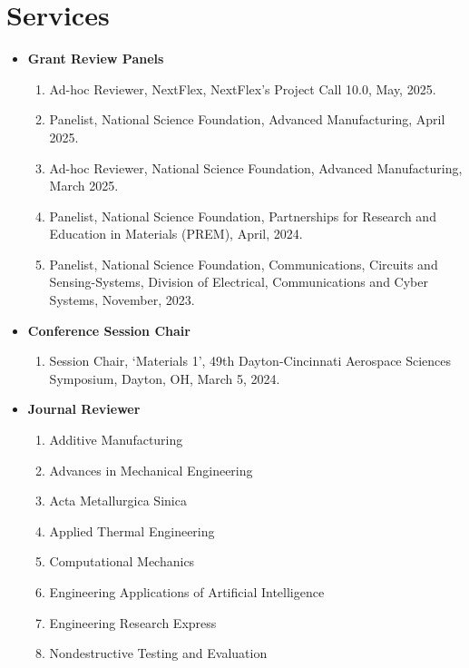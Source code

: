 \documentclass[11pt, letterpaper]{article}
\begin{document}
\section{Services}
    \begin{itemize}
        \ifdefined\isinternal
        \item \textbf{Grant Review Panels}
        \begin{enumerate}[label=\arabic*., itemsep=-1pt, topsep=2pt]    
            \item Ad-hoc Reviewer, NextFlex, NextFlex's Project Call 10.0, May, 2025.
            \item Panelist, National Science Foundation, Advanced Manufacturing, April 2025.
            \item Ad-hoc Reviewer, National Science Foundation, Advanced Manufacturing, March 2025.
            \item Panelist, National Science Foundation, Partnerships for Research and Education in Materials (PREM), April, 2024.
            \item Panelist, National Science Foundation, Communications, Circuits and Sensing-Systems, Division of Electrical, Communications and Cyber Systems, November, 2023.
        \end{enumerate}
        \fi
        \item \textbf{Conference Session Chair}
        \begin{enumerate}[label=\arabic*., itemsep=-1pt, topsep=2pt]    
            \item Session Chair, ‘Materials 1’, 49th Dayton-Cincinnati Aerospace Sciences Symposium, Dayton, OH, March 5, 2024.
        \end{enumerate}
        \item \textbf{Journal Reviewer}
        \begin{enumerate}
            \item Additive Manufacturing
            \item Advances in Mechanical Engineering
            \item Acta Metallurgica Sinica
            \item Applied Thermal Engineering
            \item Computational Mechanics
            \item Engineering Applications of Artificial Intelligence
            \item Engineering Research Express
            \item Nondestructive Testing and Evaluation

\end{enumerate}
\end{itemize}
\end{document}
